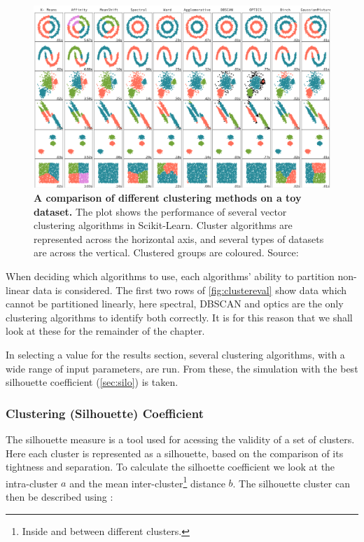 \begin{figure}[H]
     \centering

         \includegraphics[width=\textwidth]{4fig/clustereval.png}

        \caption{\textbf{A comparison of different clustering methods on a toy dataset.} The plot shows the performance of several vector clustering algorithms in Scikit-Learn. Cluster algorithms are represented across the horizontal axis, and several types of datasets are across the vertical. Clustered groups are coloured. Source: \citep{clustereval}}
        \label{fig:clustereval}
\end{figure}


When deciding which algorithms to use, each algorithms' ability to partition non-linear data is considered.
The first two rows of \autoref{fig:clustereval} show data which cannot be partitioned linearly, here spectral, DBSCAN and optics are the only clustering algorithms to identify both correctly. It is for this reason that we shall look at these for the remainder of the chapter.

In selecting a value for the results section, several clustering algorithms, with a wide range of input parameters, are run. From these, the simulation with the best silhouette coefficient (\autoref{sec:silo}) is taken.




\subsubsection{Clustering (Silhouette) Coefficient}\label{sec:silo}
The silhouette measure is a tool used for acessing the validity of a set of clusters. Here each cluster is represented as a silhouette, based on the comparison of its tightness and separation. To calculate the silhoette coefficient we look at the intra-cluster $a$ and the mean inter-cluster\footnote{Inside and between different clusters.} distance $b$. The silhouette cluster can then be described using \citep{silhouette,sklearn}:


